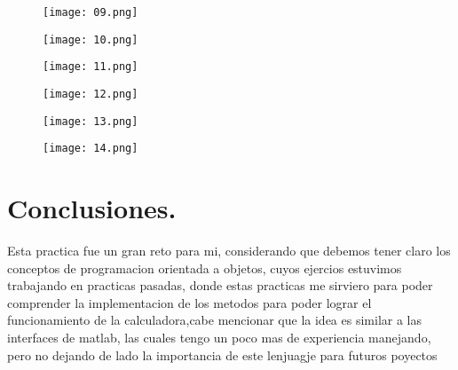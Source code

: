 \documentclass[11pt]{article}
\begin{document}
\begin{figure}[htbp]
  \begin{minipage}[b]{0.5\textwidth}
    \centering
    \texttt{[image: 09.png]}
    \caption{}
    \label{fig:imagen1}
  \end{minipage}
  \hfill
  \begin{minipage}[b]{0.5\textwidth}
    \centering
    \texttt{[image: 10.png]}
    \caption{}
    \label{fig:imagen2}
  \end{minipage}
\end{figure}

\begin{figure}[htbp]
  \begin{minipage}[b]{0.5\textwidth}
    \centering
    \texttt{[image: 11.png]}
    \caption{}
    \label{fig:imagen1}
  \end{minipage}
  \hfill
  \begin{minipage}[b]{0.5\textwidth}
    \centering
    \texttt{[image: 12.png]}
    \caption{}
    \label{fig:imagen2}
  \end{minipage}
\end{figure}

\begin{figure}[htbp]
  \begin{minipage}[b]{0.5\textwidth}
    \centering
    \texttt{[image: 13.png]}
    \caption{}
    \label{fig:imagen1}
  \end{minipage}
  \hfill
  \begin{minipage}[b]{0.5\textwidth}
    \centering
    \texttt{[image: 14.png]}
    \caption{}
    \label{fig:imagen2}
  \end{minipage}
\end{figure}

\newpage
\section{Conclusiones.}
Esta practica fue un gran reto para mi, considerando que debemos tener claro los conceptos de programacion orientada a objetos, cuyos ejercios estuvimos trabajando en practicas pasadas, donde estas practicas me sirviero para poder comprender la implementacion de los metodos para poder lograr el funcionamiento de la calculadora,cabe mencionar que la idea es similar a las interfaces de matlab, las cuales tengo un poco mas de experiencia manejando, pero no dejando de lado la importancia de este lenjuagje para futuros poyectos









 
\end{document}
